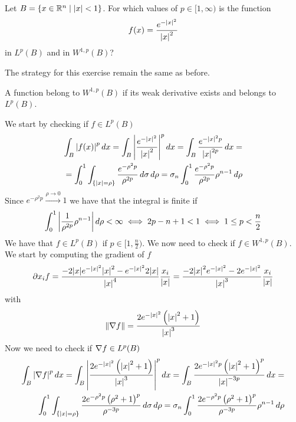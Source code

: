     \newpage
\begin{exercise}
    Let \(B = \left\{ x \in \mathbb{R}^n \mid \abs{x} < 1 \right\}\). For which values of \(p \in [1, \infty) \) is the function
    \[
        f(x) = \frac{e^{-\abs{x}^2}}{\abs{x}^2}
    \]
    in \(L^p(B)\) and in \(W^{1, p}(B)\)?
\end{exercise}
The strategy for this exercise remain the same as before.
\begin{remark}
    A function belong to \(W^{1, p}(B)\) if its weak derivative exists and belongs to \(L^p(B)\).
\end{remark}
We start by checking if \(f \in L^p(B)\)
\[
    \begin{split}
        \int_B \abs{f(x)}^p \, dx = \int_B \abs{\frac{e^{-\abs{x}^2}}{\abs{x}^2}}^p \, dx = \int_B \frac{e^{-\abs{x}^2p}}{\abs{x}^{2p}} \, dx = \\
        = \int_0^1 \int_{\left\{\abs{x} = \rho\right\}} \frac{e^{-\rho^2 p}}{\rho^{2p}} \, d\sigma \, d\rho = \sigma_n \int_0^1 \frac{e^{-\rho^2 p}}{\rho^{2p}} \rho^{n-1} \, d\rho
    \end{split}
\]
Since \(e^{-\rho^2 p} \overset{\rho \to 0}{\longrightarrow} 1\) we have that the integral is finite if
\[
    \begin{split}
        \int_0^1 \abs{\frac{1}{\rho^{2p}} \rho^{n-1}} \, d\rho < \infty \iff 2p - n + 1 < 1 \iff 1 \leq p < \frac{n}{2}
    \end{split}
\]
We have that \(f \in L^p(B)\) if \(p \in [1, \frac{n}{2})\). We now need to check if \(f \in W^{1, p}(B)\). We start by computing the gradient of \(f\)
\[
    \begin{split}
        \partial x_i f = \frac{-2 \abs{x} e^{-\abs{x}^2} \abs{x}^2 - e^{-\abs{x}^2} 2\abs{x}}{\abs{x}^4} \frac{x_i}{\abs{x}} = \frac{-2 \abs{x}^2 e^{-\abs{x}^2} - 2 e^{-\abs{x}^2}}{\abs{x}^3} \frac{x_i}{\abs{x}} 
    \end{split}
\]
with 
\[
    \begin{split}
        \norm{\nabla f} = \frac{2 e^{-\abs{x}^2} \left(\abs{x}^2 + 1\right)}{\abs{x}^3}
    \end{split}
\]
Now we need to check if \(\nabla f \in L^p(B)\)
\[
    \begin{split}
        \int_B \abs{\nabla f}^p \, dx = \int_B \abs{\frac{2 e^{-\abs{x}^2} \left(\abs{x}^2 + 1\right)}{\abs{x}^3}}^p \, dx = \int_B  \frac{2e^{-\abs{x}^2p} \left(\abs{x}^2 + 1\right)^p} {\abs{x}^{-3p}} \, dx = \\
        \int_0^1 \int_{\left\{\abs{x} = \rho\right\}}  \frac{2e^{-\rho^2 p} \left(\rho^2 + 1\right)^p} {\rho^{-3p}} \, d\sigma \, d\rho = \sigma_n \int_0^1  \frac{2e^{-\rho^2 p} \left(\rho^2 + 1\right)^p} {\rho^{-3p}} \rho^{n-1} \, d\rho
    \end{split}
\]
